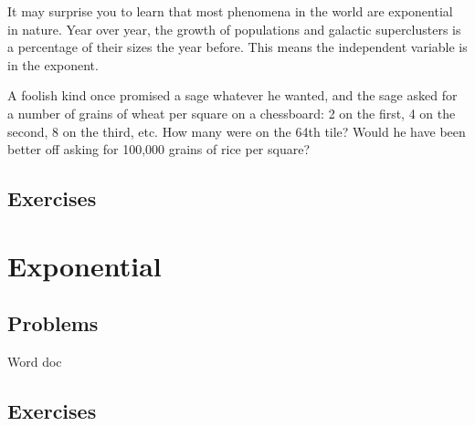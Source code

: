 

It may surprise you to learn that most phenomena in the world are exponential in nature.
Year over year, the growth of populations and galactic superclusters is a percentage of 
their sizes the year before.  This means the independent variable is in the exponent.

A foolish kind once promised a sage whatever he wanted, and the sage asked for
a number of grains of wheat per square on a chessboard: 2 on the first, 4 on the second, 
8 on the third, etc.  How many were on the 64th tile?  Would he have been better off
asking for 100,000 grains of rice per square?

\newpage
\chapterminitoc

\newpage
{}
\newpage

\newpage
\subsection{Exercises}


\newpage
\section{Exponential}
\subsection{Problems}
Word doc
\newpage

\newpage
\subsection{Exercises}
\noindent{}
\newpage
\noindent{}
\newpage
\noindent{}
\newpage
\noindent{}



